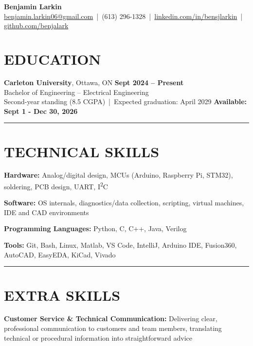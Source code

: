 \documentclass[10pt]{article}
\begin{document}
\begin{center}
{\Large \textbf{Benjamin Larkin}}\\
\vspace{4pt}
\href{mailto:benjamin.larkin06@gmail.com}{benjamin.larkin06@gmail.com} \,|\, (613) 296-1328 \,|\, 
\href{https://linkedin.com/in/bensjlarkin}{linkedin.com/in/bensjlarkin} \,|\, 
\href{https://github.com/benjalark}{github.com/benjalark}
\end{center}
\vspace{-3pt}

\section*{EDUCATION}
\textbf{Carleton University}, Ottawa, ON \hfill \textbf{Sept 2024 -- Present}\\
Bachelor of Engineering -- Electrical Engineering\\
Second-year standing (8.5 CGPA) \,|\, Expected graduation: April 2029 \hfill \textbf{Available: Sept 1 - Dec 30, 2026}

\vspace{4pt}
\hrule
\vspace{6pt}

\section*{TECHNICAL SKILLS}
\textbf{Hardware:} Analog/digital design, MCUs (Arduino, Raspberry Pi, STM32), soldering, PCB design, UART, I\textsuperscript{2}C

\textbf{Software:} OS internals, diagnostics/data collection, scripting, virtual machines, IDE and CAD environments

\textbf{Programming Languages:} Python, C, C++, Java, Verilog

\textbf{Tools:} Git, Bash, Linux, Matlab, VS Code, IntelliJ, Arduino IDE, Fusion360, AutoCAD, EasyEDA, KiCad, Vivado

\vspace{4pt}
\hrule
\vspace{6pt}

\section*{EXTRA SKILLS}
\textbf{Customer Service \& Technical Communication:} Delivering clear, professional communication to customers and team members, translating technical or procedural information into straightforward advice
\end{document}
